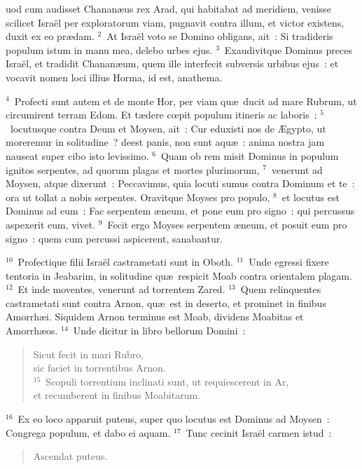 \bchapter
{}uod cum audisset Chanan\ae us rex Arad, qui habitabat ad meridiem, venisse scilicet Isra\"el per exploratorum viam, pugnavit contra illum, et victor existens, duxit ex eo pr\ae dam.
${}^{2}$~At Isra\"el voto se Domino obligans, ait~: Si tradideris populum istum in manu mea, delebo urbes ejus.
${}^{3}$~Exaudivitque Dominus preces Isra\"el, et tradidit Chanan\ae um, quem ille interfecit subversis urbibus ejus~: et vocavit nomen loci illius Horma, id est, anathema.


${}^{4}$~Profecti sunt autem et de monte Hor, per viam qu\ae\ ducit ad mare Rubrum, ut circumirent terram Edom. Et t\ae dere cœpit populum itineris ac laboris~:
${}^{5}$~locutusque contra Deum et Moysen, ait~: Cur eduxisti nos de \AE gypto, ut moreremur in solitudine~? deest panis, non sunt aqu\ae~: anima nostra jam nauseat super cibo isto levissimo.
${}^{6}$~Quam ob rem misit Dominus in populum ignitos serpentes, ad quorum plagas et mortes plurimorum,
${}^{7}$~venerunt ad Moysen, atque dixerunt~: Peccavimus, quia locuti sumus contra Dominum et te~: ora ut tollat a nobis serpentes. Oravitque Moyses pro populo,
${}^{8}$~et locutus est Dominus ad eum~: Fac serpentem \ae neum, et pone eum pro signo~: qui percussus aspexerit eum, vivet.
${}^{9}$~Fecit ergo Moyses serpentem \ae neum, et posuit eum pro signo~: quem cum percussi aspicerent, sanabantur.


${}^{10}$~Profectique filii Isra\"el castrametati sunt in Oboth.
${}^{11}$~Unde egressi fixere tentoria in Jeabarim, in solitudine qu\ae\ respicit Moab contra orientalem plagam.
${}^{12}$~Et inde moventes, venerunt ad torrentem Zared.
${}^{13}$~Quem relinquentes castrametati sunt contra Arnon, qu\ae\ est in deserto, et prominet in finibus Amorrh\ae i. Siquidem Arnon terminus est Moab, dividens Moabitas et Amorrh\ae os.
${}^{14}$~Unde dicitur in libro bellorum Domini~: \begin{verse}Sicut fecit in mari Rubro,\\ sic faciet in torrentibus Arnon.\\
${}^{15}$~Scopuli torrentium inclinati sunt, ut requiescerent in Ar,\\ et recumberent in finibus Moabitarum.\end{verse}


${}^{16}$~Ex eo loco apparuit puteus, super quo locutus est Dominus ad Moysen~: Congrega populum, et dabo ei aquam.
${}^{17}$~Tunc cecinit Isra\"el carmen istud~: \begin{verse}Ascendat puteus.\end{verse}


